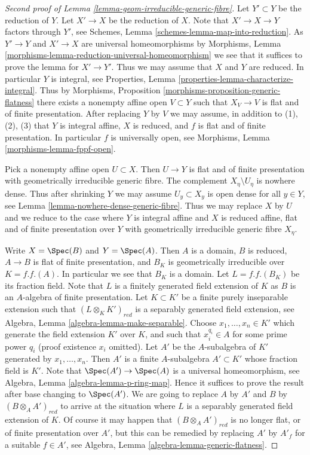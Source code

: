 \begin{proof}[Second proof of Lemma \ref{lemma-geom-irreducible-generic-fibre}]
Let $Y' \subset Y$ be the reduction of $Y$. Let $X' \to X$ be the reduction
of $X$. Note that $X' \to X  \to Y$ factors through $Y'$, see
Schemes, Lemma \ref{schemes-lemma-map-into-reduction}.
As $Y' \to Y$ and $X' \to X$ are universal
homeomorphisms by
Morphisms, Lemma \ref{morphisms-lemma-reduction-universal-homeomorphism}
we see that it suffices to prove the lemma for $X' \to Y'$. Thus
we may assume that $X$ and $Y$ are reduced. In particular $Y$ is integral, see
Properties, Lemma \ref{properties-lemma-characterize-integral}.
Thus by
Morphisms, Proposition \ref{morphisms-proposition-generic-flatness}
there exists a nonempty affine open $V \subset Y$ such that $X_V \to V$ is
flat and of finite presentation. After replacing $Y$ by $V$ we may
assume, in addition to (1), (2), (3) that $Y$ is integral affine, $X$
is reduced, and $f$ is flat and of finite presentation. In particular
$f$ is universally open, see
Morphisms, Lemma \ref{morphisms-lemma-fppf-open}.

\medskip\noindent
Pick a nonempty affine open $U \subset X$. Then $U \to Y$ is flat and of
finite presentation with geometrically irreducible generic fibre.
The complement $X_\eta \setminus U_\eta$ is nowhere dense. Thus after
shrinking $Y$ we may assume $U_y \subset X_y$ is open dense for all
$y \in Y$, see
Lemma \ref{lemma-nowhere-dense-generic-fibre}.
Thus we may replace $X$ by $U$ and we reduce to the
case where $Y$ is integral affine and $X$ is reduced affine, flat and of finite
presentation over $Y$ with geometrically irreducible generic fibre $X_\eta$.

\medskip\noindent
Write $X = \Spec(B)$ and $Y = \Spec(A)$. Then $A$ is a domain,
$B$ is reduced, $A \to B$ is flat of finite presentation, and $B_K$ is
geometrically irreducible over $K = f.f.(A)$. In particular we see that
$B_K$ is a domain. Let $L = f.f.(B_K)$ be its fraction field. Note that
$L$ is a finitely generated field extension of $K$ as $B$ is an $A$-algebra
of finite presentation. Let $K \subset K'$ be a finite purely inseparable
extension such that $(L \otimes_K K')_{red}$ is a separably generated field
extension, see
Algebra, Lemma \ref{algebra-lemma-make-separable}.
Choose $x_1, \ldots, x_n \in K'$ which generate the field extension
$K'$ over $K$, and such that $x_i^{q_i} \in A$ for some prime power
$q_i$ (proof existence $x_i$ omitted). Let $A'$ be the $A$-subalgebra
of $K'$ generated by $x_1, \ldots, x_n$. Then $A'$ is a finite
$A$-subalgebra $A' \subset K'$ whose fraction field is $K'$. Note that
$\Spec(A') \to \Spec(A)$ is a universal homeomorphism, see
Algebra, Lemma \ref{algebra-lemma-p-ring-map}.
Hence it suffices to prove the result after base changing to $\Spec(A')$.
We are going to replace $A$ by $A'$ and $B$ by $(B \otimes_A A')_{red}$
to arrive at the situation where $L$ is a separably generated field extension
of $K$. Of course it may happen that $(B \otimes_A A')_{red}$ is no longer
flat, or of finite presentation over $A'$, but this can be remedied by
replacing $A'$ by  $A'_f$ for a suitable $f \in A'$, see
Algebra, Lemma \ref{algebra-lemma-generic-flatness}.


\end{proof}
